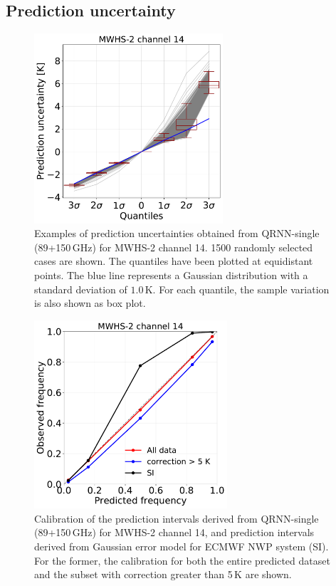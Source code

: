 \documentclass[amt, manuscript]{copernicus}
\begin{document}
\subsection{Prediction uncertainty}
\label{sec:uncertainty_mwhs}
\begin{figure}[t]
	\includegraphics[width = 70mm]{Figures/prediction_uncertainty_MWHS_14.pdf}	
	\caption{Examples of prediction uncertainties obtained from QRNN-single (89+150\,GHz) for MWHS-2 channel 14. 1500 randomly selected cases are shown. The quantiles have been plotted at equidistant points. The blue line represents a Gaussian distribution with a standard deviation of $1.0$\,K. For each quantile, the sample variation is also shown as box plot. }
	\label{fig:prediction_uncertainty_mwhs}	
\end{figure}
\begin{figure}[t]
	\includegraphics[height = 70mm]{Figures/calibration_QRNN_MWHS_14.pdf}	
	\caption{Calibration of the prediction intervals derived from QRNN-single (89+150\,GHz) for MWHS-2 channel 14, and prediction intervals derived from Gaussian error model for ECMWF NWP system (SI). For the former, the calibration for both the entire predicted dataset and the subset with correction greater than 5\,K are shown. }
	\label{fig:calibration_mwhs}	
\end{figure}
\end{document}
